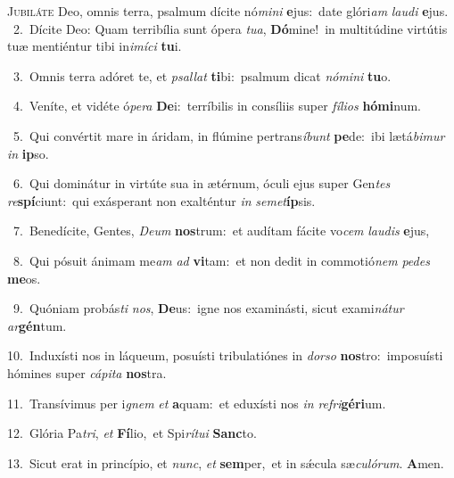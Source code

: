 \lettrine{\initial\textcolor{\initialcolor}{J}}{ubiláte} Deo, omnis terra, psalmum dícite nó\-\textit{mi}\-\textit{ni} \textbf{e}\-jus:~\star date glóri\textit{am} \textit{lau}\-\textit{di} \textbf{e}\-jus.\\
{\numbfont\textcolor{\numbcolor}{~2.}}~Dícite Deo: Quam terribília sunt ópera \textit{tu}\-\textit{a}, \textbf{Dó}\-mine!~\star in multitúdine virtútis tuæ mentiéntur tibi in\-\textit{i}\-\textit{mí}\textit{ci} \textbf{tu}\-i.\par
{\numbfont\textcolor{\numbcolor}{~3.}}~Omnis terra adóret te, et \textit{psal}\-\textit{lat} \textbf{ti}\-bi:~\star psalmum dicat \textit{nó}\-\textit{mi}\textit{ni} \textbf{tu}\-o.\par
{\numbfont\textcolor{\numbcolor}{~4.}}~Veníte, et vidéte ó\-\textit{pe}\-\textit{ra} \textbf{De}\-i:~\star terríbilis in consíliis super \textit{fí}\-\textit{li}\textit{os} \textbf{hó}\-\textbf{mi}num.\par
{\numbfont\textcolor{\numbcolor}{~5.}}~Qui convértit mare in áridam, in flúmine pertrans\-\textit{í}\-\textit{bunt} \textbf{pe}\-de:~\star ibi lætá\-\textit{bi}\-\textit{mur} \textit{in} \textbf{ip}\-so.\par
{\numbfont\textcolor{\numbcolor}{~6.}}~Qui dominátur in virtúte sua in ætérnum, óculi ejus super Gen\textit{tes} \textit{re}\-\textbf{spí}ciunt:~\star qui exásperant non exalténtur \textit{in} \textit{se}\-\textit{met}\textbf{íp}sis.\par
{\numbfont\textcolor{\numbcolor}{~7.}}~Benedícite, Gentes, \textit{De}\-\textit{um} \textbf{nos}\-trum:~\star et audítam fácite vo\textit{cem} \textit{lau}\-\textit{dis} \textbf{e}\-jus,\par
{\numbfont\textcolor{\numbcolor}{~8.}}~Qui pósuit ánimam me\textit{am} \textit{ad} \textbf{vi}\-tam:~\star et non dedit in commotió\textit{nem} \textit{pe}\-\textit{des} \textbf{me}\-os.\par
{\numbfont\textcolor{\numbcolor}{~9.}}~Quóniam probás\textit{ti} \textit{nos}\-, \textbf{De}\-us:~\star igne nos examinásti, sicut exami\-\textit{ná}\-\textit{tur} \textit{ar}\-\textbf{gén}tum.\par
{\numbfont\textcolor{\numbcolor}{10.}}~Induxísti nos in láqueum, posuísti tribulatiónes in \textit{dor}\-\textit{so} \textbf{nos}\-tro:~\star imposuísti hómines super \textit{cá}\-\textit{pi}\textit{ta} \textbf{nos}\-tra.\par
{\numbfont\textcolor{\numbcolor}{11.}}~Transívimus per i\textit{gnem} \textit{et} \textbf{a}\-quam:~\star et eduxísti nos \textit{in} \textit{re}\-\textit{fri}\textbf{gé}\textbf{ri}um.\par
{\numbfont\textcolor{\numbcolor}{12.}}~Glória Pa\-\textit{tri}\-, \textit{et} \textbf{Fí}\-lio,~\star et Spi\-\textit{rí}\-\textit{tu}\textit{i} \textbf{Sanc}\-to.\par
{\numbfont\textcolor{\numbcolor}{13.}}~Sicut erat in princípio, et \textit{nunc}\-, \textit{et} \textbf{sem}\-per,~\star et in sǽcula sæ\-\textit{cu}\-\textit{ló}\textit{rum}. \textbf{A}\-men.\par

